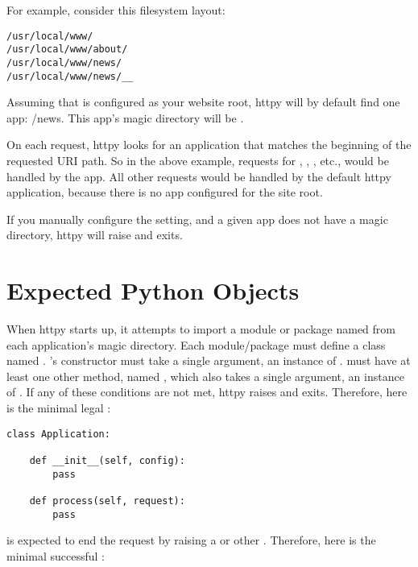 For example, consider this filesystem layout:

\begin{verbatim}
/usr/local/www/
/usr/local/www/about/
/usr/local/www/news/
/usr/local/www/news/__
\end{verbatim}

Assuming that  is configured as your website root, httpy
will by default find one app: /news. This app's magic directory will be
.

On each request, httpy looks for an application that matches the beginning of
the requested URI path. So in the above example, requests for ,
, , etc., would be handled by the
 app. All other requests would be handled by the default httpy
application, because there is no app configured for the site root.

If you manually configure the  setting, and a given app does not have
a magic directory, httpy will raise  and exits.



\section{Expected Python Objects}

When httpy starts up, it attempts to import a module or package named
 from each application's magic directory. Each 
module/package must define a class named .
's constructor must take a single argument, an instance of
.  must have at least one other method,
named , which also takes a single argument, an instance of
. If any of these conditions are not met, httpy raises
 and exits. Therefore, here is the minimal legal
:

\begin{verbatim}
class Application:

    def __init__(self, config):
        pass

    def process(self, request):
        pass

\end{verbatim}

 is expected to end the request by raising a
 or other . Therefore, here is the minimal
successful :

